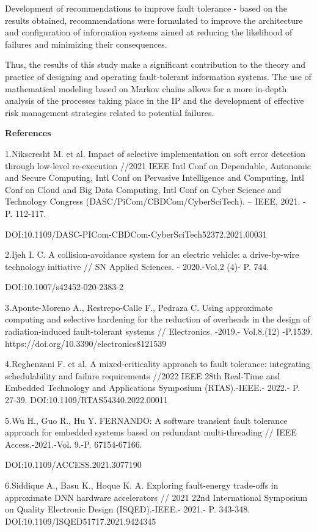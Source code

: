 Development of recommendations to improve fault tolerance - based on the
results obtained, recommendations were formulated to improve the
architecture and configuration of information systems aimed at reducing
the likelihood of failures and minimizing their consequences.

Thus, the results of this study make a significant contribution to the
theory and practice of designing and operating fault-tolerant
information systems. The use of mathematical modeling based on Markov
chains allows for a more in-depth analysis of the processes taking place
in the IP and the development of effective risk management strategies
related to potential failures.

\textbf{References}

1.Nikscresht M. et al. Impact of selective implementation on soft error
detection through low-level re-execution //2021 IEEE Intl Conf on
Dependable, Autonomic and Secure Computing, Intl Conf on Pervasive
Intelligence and Computing, Intl Conf on Cloud and Big Data Computing,
Intl Conf on Cyber Science and Technology Congress
(DASC/PiCom/CBDCom/CyberSciTech). -- IEEE, 2021. - P. 112-117.

DOI:10.1109/DASC-PICom-CBDCom-CyberSciTech52372.2021.00031

2.Ijeh I. C. A collision-avoidance system for an electric vehicle: a
drive-by-wire technology initiative // SN Applied Sciences. -
2020.-Vol.2 (4)- P. 744.

DOI:10.1007/s42452-020-2383-2

3.Aponte-Moreno A., Restrepo-Calle F., Pedraza C. Using approximate
computing and selective hardening for the reduction of overheads in the
design of radiation-induced fault-tolerant systems // Electronics.
-2019.- Vol.8.(12) -P.1539. https://doi.org/10.3390/electronics8121539

4.Reghenzani F. et al. A mixed-criticality approach to fault tolerance:
integrating schedulability and failure requirements //2022 IEEE 28th
Real-Time and Embedded Technology and Applications Symposium
(RTAS).-IEEE.- 2022.- P. 27-39. DOI:10.1109/RTAS54340.2022.00011

5.Wu H., Guo R., Hu Y. FERNANDO: A software transient fault tolerance
approach for embedded systems based on redundant multi-threading // IEEE
Access.-2021.-Vol. 9.-P. 67154-67166.

DOI:10.1109/ACCESS.2021.3077190

6.Siddique A., Basu K., Hoque K. A. Exploring fault-energy trade-offs in
approximate DNN hardware accelerators // 2021 22nd International
Symposium on Quality Electronic Design (ISQED).-IEEE.- 2021.- P.
343-348. DOI:10.1109/ISQED51717.2021.9424345

